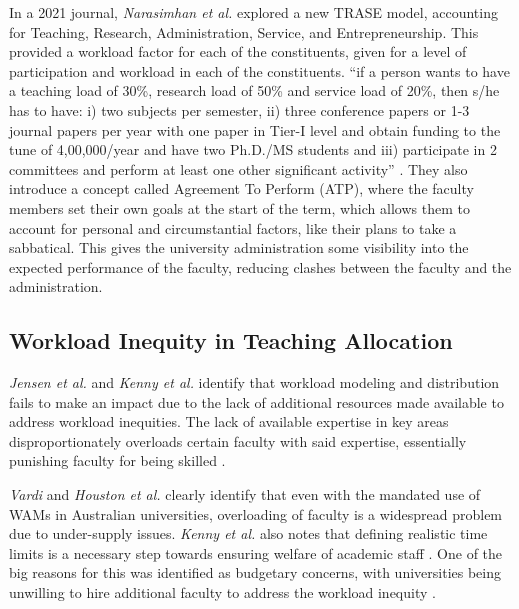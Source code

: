 In a 2021 journal, \textit{Narasimhan et al.} explored a new TRASE model, accounting for Teaching, Research, Administration, Service, and Entrepreneurship. This provided a workload factor for each of the constituents, given for a level of participation and workload in each of the constituents. ``if a person wants to have a teaching load of 30\%, research load of 50\% and service load of 20\%, then s/he has to have: i) two subjects per semester, ii) three conference papers or 1-3 journal papers per year with one paper in Tier-I level and obtain funding to the tune of 4,00,000/year and have two Ph.D./MS students and iii) participate in 2 committees and perform at least one other significant activity'' \cite{narasimhan32trase}. They also introduce a concept called Agreement To Perform (ATP), where the faculty members set their own goals at the start of the term, which allows them to account for personal and circumstantial factors, like their plans to take a sabbatical. This gives the university administration some visibility into the expected performance of the faculty, reducing clashes between the faculty and the administration.

\subsection{Workload Inequity in Teaching Allocation}

\textit{Jensen et al.} \cite{jensen2009overload} and \textit{Kenny et al.} identify that workload modeling and distribution fails to make an impact due to the lack of additional resources made available to address workload inequities. The lack of available expertise in key areas disproportionately overloads certain faculty with said expertise, essentially punishing faculty for being skilled \cite{jensen2009overload, kenny2014effectiveness}.

\textit{Vardi} and \textit{Houston et al.} \cite{vardi2009impacts, houston2006academic} clearly identify that even with the mandated use of WAMs in Australian universities, overloading of faculty is a widespread problem due to under-supply issues. \textit{Kenny et al.}  also notes that defining realistic time limits is a necessary step towards ensuring welfare of academic staff \cite{kenny2014effectiveness}. One of the big reasons for this was identified as budgetary concerns, with universities being unwilling to hire additional faculty to address the workload inequity \cite{kenny2012placing}.

